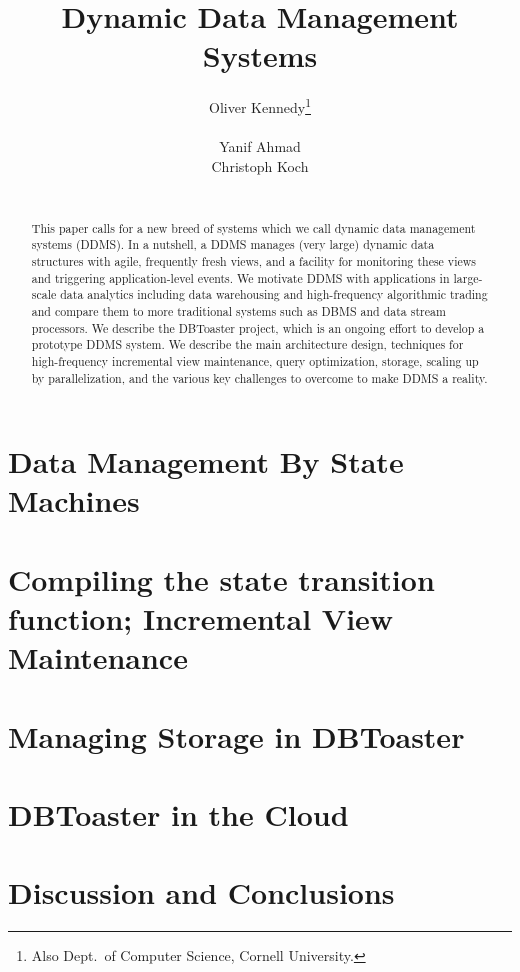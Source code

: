 \documentclass{sig-alternate}
\begin{document}
\title{Dynamic Data Management Systems}
\author{
\alignauthor
Oliver Kennedy\thanks{Also Dept.\ of Computer Science, Cornell University.}\\
     \\
\alignauthor
Yanif Ahmad\\
\alignauthor
Christoph Koch\\
     \\
}
\maketitle

\begin{abstract}
This paper calls for a new breed of systems which
we call dynamic data management systems (DDMS). In a nutshell,
a DDMS manages (very large) dynamic data structures with 
agile, frequently fresh views, and a facility for monitoring
these views and triggering application-level events.
%
We motivate DDMS with applications in large-scale data analytics
including data warehousing and high-frequency algorithmic trading
and compare them to more traditional systems such as DBMS and
data stream processors.
%
We describe the DBToaster project, which is an ongoing effort to
develop a prototype DDMS system. We describe the main architecture
design, techniques for high-frequency incremental view maintenance,
query optimization, storage, scaling up by parallelization, and
the various key challenges to overcome to make DDMS a reality.
\end{abstract}



\section{Data Management By State Machines}

\label{sec:overview}


\section{Compiling the state transition function; Incremental View Maintenance}
\label{sec:dbtoaster}



\section{Managing Storage in DBToaster}
\label{sec:storage}



\section{DBToaster in the Cloud}
\label{sec:distribution}


\section{Discussion and Conclusions}



\end{document}
